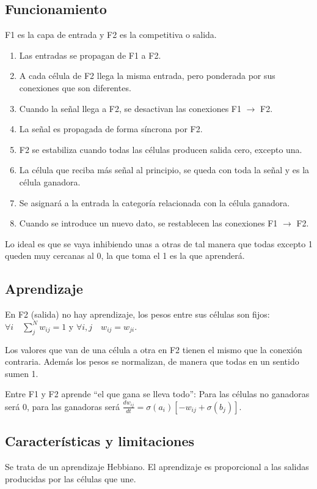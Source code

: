 \documentclass[12pt, twoside, openright]{report} %
\begin{document}
\subsection{Funcionamiento}
F1 es la capa de entrada y F2 es la competitiva o salida.
\begin{enumerate}
	\item Las entradas se propagan de F1 a F2.
	\item A cada célula de F2 llega la misma entrada, pero ponderada por sus conexiones que son diferentes.
	\item Cuando la señal llega a F2, se desactivan las conexiones F1 $\rightarrow$ F2.
	\item La señal es propagada de forma síncrona por F2.
	\item F2 se estabiliza cuando todas las células producen salida cero, excepto una.
	\item La célula que reciba más señal al principio, se queda con toda la señal y es la célula ganadora.
	\item Se asignará a la entrada la categoría relacionada con la célula ganadora.
	\item Cuando se introduce un nuevo dato, se restablecen las conexiones F1 $\rightarrow$ F2.
\end{enumerate}

Lo ideal es que se vaya inhibiendo unas a otras de tal manera que todas excepto 1 queden muy cercanas al 0, la que toma el 1 es la que aprenderá.

\subsection{Aprendizaje}
En F2 (salida) no hay aprendizaje, los pesos entre sus células son fijos: $\forall i \quad \sum^N_j w_{ij}=1$ y $\forall i, j \quad w_{ij}=w_{ji}$.

Los valores que van de una célula a otra en F2 tienen el mismo que la conexión contraria. Además los pesos se normalizan, de manera que todas en un sentido sumen 1.

Entre F1 y F2 aprende “el que gana se lleva todo”: Para las células no ganadoras será 0, para las ganadoras será $\frac{dw_{ij}}{dt}=\sigma(a_i)[-w_{ij}+\sigma(b_j)]$.

\subsection{Características y limitaciones}
Se trata de un aprendizaje Hebbiano. El aprendizaje es proporcional a las salidas producidas por las células que une.
\end{document}
